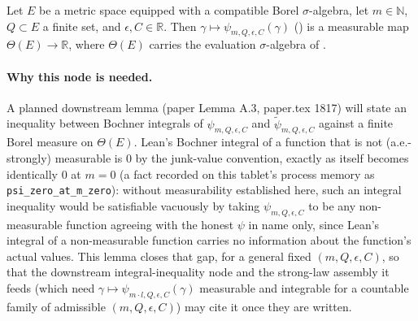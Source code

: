\begin{lemma}
  Let $E$ be a metric space equipped with a compatible Borel $\sigma$-algebra, let
  $m \in \mathbb{N}$, $Q \subset E$ a finite set, and $\epsilon, C \in \mathbb{R}$. Then
  $\gamma \mapsto \psi_{m,Q,\epsilon,C}(\gamma)$ () is a measurable map
  $\Theta(E) \to \mathbb{R}$, where $\Theta(E)$ carries the evaluation $\sigma$-algebra of
  .

  \paragraph{Why this node is needed.} A planned downstream lemma (paper Lemma A.3, paper.tex 1817)
  will state an inequality between Bochner integrals of $\psi_{m,Q,\epsilon,C}$ and
  $\tilde\psi_{m,Q,\epsilon,C}$ against a finite Borel measure on $\Theta(E)$. Lean's Bochner
  integral of a function that is not (a.e.-strongly) measurable is $0$ by the junk-value convention,
  exactly as  itself becomes identically $0$ at $m=0$ (a fact recorded on this
  tablet's process memory as \texttt{psi\_zero\_at\_m\_zero}): without measurability established
  here, such an integral inequality would be satisfiable vacuously by taking $\psi_{m,Q,\epsilon,C}$
  to be any non-measurable function agreeing with the honest $\psi$ in name only, since Lean's
  integral of a non-measurable function carries no information about the function's actual values.
  This lemma closes that gap, for a general fixed $(m,Q,\epsilon,C)$, so that the downstream
  integral-inequality node and the strong-law assembly it feeds (which need
  $\gamma\mapsto\psi_{m\cdot l,Q,\epsilon,C}(\gamma)$ measurable and integrable for a countable
  family of admissible $(m,Q,\epsilon,C)$) may cite it once they are written.
\end{lemma}

